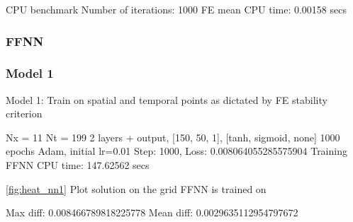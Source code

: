 CPU benchmark
Number of iterations: 1000
FE mean CPU time: 0.00158 secs


\subsubsection{FFNN}

\subsubsection{Model 1}
Model 1: Train on spatial and temporal points as dictated by FE stability criterion

Nx = 11
Nt = 199
2 layers + output, [150, 50, 1], [tanh, sigmoid, none] 
1000 epochs
Adam, initial lr=0.01
Step: 1000, Loss: 0.008064055285575904
Training FFNN CPU time: 147.62562 secs

\autoref{fig:heat_nn1} Plot solution on the grid FFNN is trained on

Max diff: 0.008466789818225778
Mean diff: 0.0029635112954797672

